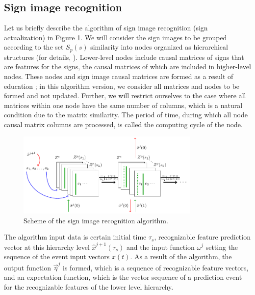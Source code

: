 \documentclass[review]{elsarticle}
\begin{document}
\subsection{Sign image recognition }\label{subsec:actual}

Let us briefly describe the algorithm of sign image recognition (sign actualization) in Figure \ref{fig:percept}. We will consider the sign images to be grouped according to the set $S_p(s)$ similarity into nodes organized as hierarchical structures (for details, \cite{Osipov2015d}). Lower-level nodes include causal matrices of signs that are features for the signs, the causal matrices of which are included in higher-level nodes. These nodes and sign image causal matrices are formed as a result of education \cite{Skrynnik2016}; in this algorithm version, we consider all matrices and nodes to be formed and not updated. Further, we will restrict ourselves to the case where all matrices within one node have the same number of columns, which is a natural condition due to the matrix similarity. The period of time, during which all node causal matrix columns are processed, is called the computing cycle of the node.

\begin{figure}
	\centering
	\includegraphics[width=0.8\textwidth]{algo/perception}
	\caption{Scheme of the sign image recognition algorithm.}
	\label{fig:percept}		
\end{figure}

The algorithm input data is certain initial time $\tau_s$, recognizable feature prediction vector at this hierarchy level $\hat x^{j+1}(\tau_s)$ and the input function $\omega^j$ setting the sequence of the event input vectors $\bar x(t)$. As a result of the algorithm, the output function $\vec \eta^j$ is formed, which is a sequence of recognizable feature vectors, and an expectation function, which is the vector sequence of a prediction event for the recognizable features of the  lower level hierarchy.
\end{document}
